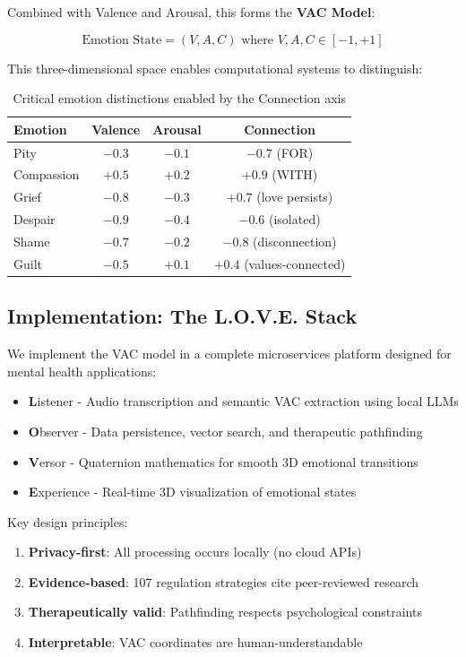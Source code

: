 \documentclass[10pt,twocolumn]{article}
\begin{document}
Combined with Valence and Arousal, this forms the \textbf{VAC Model}:

$$\text{Emotion State} = (V, A, C) \text{ where } V, A, C \in [-1, +1]$$

This three-dimensional space enables computational systems to distinguish:

\begin{table}[h]
\centering
\caption{Critical emotion distinctions enabled by the Connection axis}
\label{tab:emotion-pairs}
\begin{tabular}{lccc}
\toprule
\textbf{Emotion} & \textbf{Valence} & \textbf{Arousal} & \textbf{Connection} \\
\midrule
Pity & $-0.3$ & $-0.1$ & $-0.7$ (FOR) \\
Compassion & $+0.5$ & $+0.2$ & $+0.9$ (WITH) \\
Grief & $-0.8$ & $-0.3$ & $+0.7$ (love persists) \\
Despair & $-0.9$ & $-0.4$ & $-0.6$ (isolated) \\
Shame & $-0.7$ & $-0.2$ & $-0.8$ (disconnection) \\
Guilt & $-0.5$ & $+0.1$ & $+0.4$ (values-connected) \\
\bottomrule
\end{tabular}
\end{table}

\subsection{Implementation: The L.O.V.E. Stack}

We implement the VAC model in a complete microservices platform designed for mental health applications:

\begin{itemize}
    \item \textbf{L}istener - Audio transcription and semantic VAC extraction using local LLMs
    \item \textbf{O}bserver - Data persistence, vector search, and therapeutic pathfinding
    \item \textbf{V}ersor - Quaternion mathematics for smooth 3D emotional transitions
    \item \textbf{E}xperience - Real-time 3D visualization of emotional states
\end{itemize}

Key design principles:
\begin{enumerate}
    \item \textbf{Privacy-first}: All processing occurs locally (no cloud APIs)
    \item \textbf{Evidence-based}: 107 regulation strategies cite peer-reviewed research
    \item \textbf{Therapeutically valid}: Pathfinding respects psychological constraints
    \item \textbf{Interpretable}: VAC coordinates are human-understandable
\end{enumerate}
\end{document}
